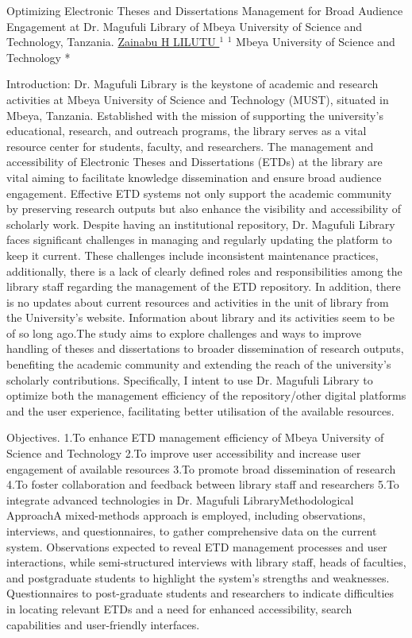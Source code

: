 
    \begin{abstract_online}{Optimizing Electronic Theses and Dissertations Management for Broad Audience Engagement at Dr. Magufuli Library of Mbeya University of Science and Technology, Tanzania.}{%
        \underline{ Zainabu H LILUTU }$^{1}$}{%
        }{%
        $^1$ Mbeya University of Science and Technology *\newline{}
            }
	
	Introduction: Dr. Magufuli Library is the keystone of academic and research activities at Mbeya University of Science and Technology (MUST), situated in Mbeya, Tanzania. Established with the mission of supporting the university’s educational, research, and outreach programs, the library serves as a vital resource center for students, faculty, and researchers. The management and accessibility of Electronic Theses and Dissertations (ETDs) at the library are vital aiming to facilitate knowledge dissemination and ensure broad audience engagement. Effective ETD systems not only support the academic community by preserving research outputs but also enhance the visibility and accessibility of scholarly work. Despite having an institutional repository, Dr. Magufuli Library faces significant challenges in managing and regularly updating the platform to keep it current. These challenges include inconsistent maintenance practices, additionally, there is a lack of clearly defined roles and responsibilities among the library staff regarding the management of the ETD repository. In addition, there is no updates about current resources and activities in the unit of library from the University’s website. Information about library and its activities seem to be of so long ago.The study aims to explore challenges and ways to improve handling of theses and dissertations to broader dissemination of research outputs, benefiting the academic community and extending the reach of the university’s scholarly contributions. Specifically, I intent to use Dr. Magufuli Library to optimize both the management efficiency of the repository/other digital platforms and the user experience, facilitating better utilisation of the available resources. 
	
	Objectives.
	1.To enhance ETD management efficiency of Mbeya University of Science and Technology
	2.To improve user accessibility and increase user engagement of available resources
	3.To promote broad dissemination of research
	4.To foster collaboration and feedback between library staff and researchers
	5.To integrate advanced technologies in Dr. Magufuli LibraryMethodological ApproachA mixed-methods approach is employed, including observations, interviews, and questionnaires, to gather comprehensive data on the current system. Observations expected to reveal ETD management processes and user interactions, while semi-structured interviews with library staff, heads of faculties, and postgraduate students to highlight the system's strengths and weaknesses. Questionnaires to post-graduate students and researchers to indicate difficulties in locating relevant ETDs and a need for enhanced accessibility, search capabilities and user-friendly interfaces.
	

\end{abstract_online}
